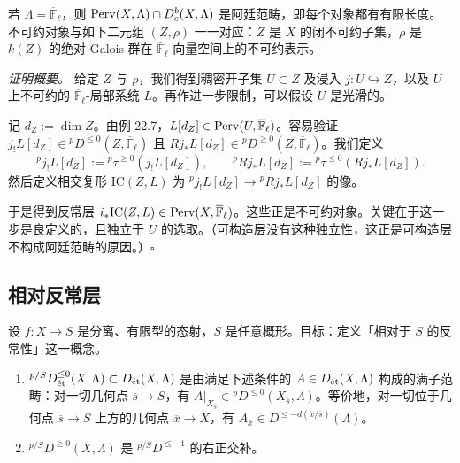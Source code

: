 \begin{theorem}
若 $\Lambda=\overline{\mathbb{F}}_\ell$，则 $\Perv(X,\Lambda)\cap D^b_c(X,\Lambda)$ 是阿廷范畴，即每个对象都有有限长度。不可约对象与如下二元组 $(Z,\rho)$ 一一对应：$Z$ 是 $X$ 的闭不可约子集，$\rho$ 是 $k(Z)$ 的绝对 Galois 群在 $\overline{\mathbb{F}}_\ell$-向量空间上的不可约表示。
\end{theorem}

\emph{证明概要。} 给定 $Z$ 与 $\rho$，我们得到稠密开子集 $U\subset Z$ 及浸入 $j\colon U\hookrightarrow Z$，以及 $U$ 上不可约的 $\overline{\mathbb{F}}_\ell$-局部系统 $L$。再作进一步限制，可以假设 $U$ 是光滑的。

记 $d_Z:=\dim Z$。由例 22.7，$L[d_Z]\in\Perv(U,\overline{\mathbb{F}}_\ell)$。容易验证 $j_!L[d_Z]\in{}^pD^{\le0}(Z,\overline{\mathbb{F}}_\ell)$ 且 $Rj_*L[d_Z]\in{}^pD^{\ge0}(Z,\overline{\mathbb{F}}_\ell)$。我们定义
\[
{}^pj_!L[d_Z]:={}^p\tau^{\ge0}(j_!L[d_Z]),\qquad
{}^pRj_*L[d_Z]:={}^p\tau^{\le0}(Rj_*L[d_Z]).
\]
然后定义相交复形 $\mathrm{IC}(Z,L)$ 为 ${}^pj_!L[d_Z]\to{}^pRj_*L[d_Z]$ 的像。

于是得到反常层 $i_*\mathrm{IC}(Z,L)\in\Perv(X,\overline{\mathbb{F}}_\ell)$。这些正是不可约对象。关键在于这一步是良定义的，且独立于 $U$ 的选取。（可构造层没有这种独立性，这正是可构造层不构成阿廷范畴的原因。）\hfill$\square$

\subsection{相对反常层}

设 $f\colon X\to S$ 是分离、有限型的态射，$S$ 是任意概形。目标：定义「相对于 $S$ 的反常性」这一概念。

\begin{definition}
\begin{enumerate}[label=(\arabic*)]
\item ${}^{p/S}D^{\le0}_\et(X,\Lambda)\subset D_\et(X,\Lambda)$ 是由满足下述条件的 $A\in D_\et(X,\Lambda)$ 构成的满子范畴：对一切几何点 $\overline{s}\to S$，有 $A|_{X_{\overline{s}}}\in{}^pD^{\le0}(X_{\overline{s}},\Lambda)$。等价地，对一切位于几何点 $\overline{s}\to S$ 上方的几何点 $\overline{x}\to X$，有 $A_{\overline{x}}\in D^{\le -d(\overline{x}/\overline{s})}(\Lambda)$。
\item ${}^{p/S}D^{\ge0}(X,\Lambda)$ 是 ${}^{p/S}D^{\le-1}$ 的右正交补。
\end{enumerate}
\end{definition}

